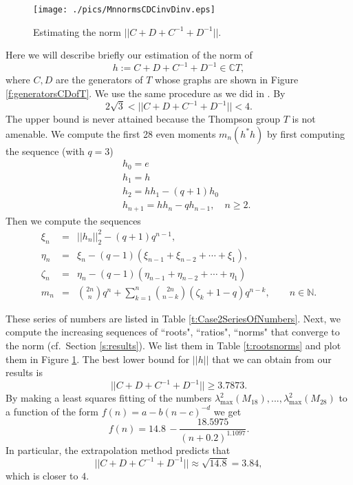 \documentclass{amsart}
\newcommand{\C}{\mathbb C}
\newcommand{\N}{\mathbb N}
\theoremstyle{definition}
\begin{document}
\begin{figure}
  \texttt{[image: ./pics/MnnormsCDCinvDinv.eps]}\\
  \caption{Estimating the norm $||C+D+C^{-1}+D^{-1}||.$}\label{f:MnnormsCDCinvDinv}
\end{figure}



Here we will describe briefly our estimation of the norm of
$$h:=C+D+C^{-1}+D^{-1}\in \C T,$$
where $C,D$ are the generators of $T$ whose graphs are shown in Figure \ref{f:generatorsCDofT}.
We use the same procedure as we did in \cite{HaagerupRamirezSolano}.
By \cite[Theorem 1.3]{HaagerupRamirezSolano}
 $$2\sqrt3< ||C+D+C^{-1}+D^{-1}||<4.$$
 The upper bound is never attained because the Thompson group $T$ is not amenable.
 We compute the first 28 even moments $m_n(h^*h)$ by first computing the sequence (with $q=3$)
 \begin{eqnarray*}
 &&h_0=e\\
 &&h_1=h\\
 &&h_2=h h_1-(q+1) h_0\\
 &&h_{n+1}=h h_n - q h_{n-1},\quad n\ge 2.
 \end{eqnarray*}
 Then we compute the sequences
 \begin{eqnarray*}
\xi_n&=&||h_n||_2^2-(q+1)q^{n-1},\\
   \eta_n&=&\xi_n-(q-1)(\xi_{n-1}+\xi_{n-2}+\cdots+\xi_1),\\
  \zeta_n&=&\eta_n-(q-1)(\eta_{n-1}+\eta_{n-2}+\cdots+\eta_1)\\
   m_n&=&\binom{2n}{n} q^n+\sum_{k=1}^{n}\binom{2n}{n-k} (\zeta_k+1-q)q^{n-k},\qquad n\in\N.
 \end{eqnarray*}
  
These series of numbers are listed in Table \ref{t:Case2SeriesOfNumbers}.
Next, we compute the increasing sequences of ``roots", ``ratios", ``norms" that converge to the norm (cf.~Section \ref{s:results}). We list them in Table \ref{t:rootsnorms} and plot them in Figure \ref{f:MnnormsCDCinvDinv}.
The best lower bound for $||h||$ that we can obtain from our results   is
$$||C+D+C^{-1}+D^{-1}||\ge 3.7873.$$
 By making a least squares fitting of the numbers $\lambda^2_{\max}(M_{18}),...,\lambda^2_{\max}(M_{28})$ to a function of the form $f(n)=a-b(n-c)^{-d}$ we get
$$f(n) = 14.8\, -\frac{18.5975}{(n+0.2)^{1.1097}}.$$
In particular, the extrapolation method predicts that
$$||C+D+C^{-1} +D^{-1} ||\approx \sqrt{14.8}=3.84,$$
 which is  closer to $4$.
\end{document}

